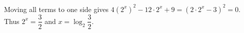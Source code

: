 Moving all terms to one side gives $4(2^x)^2-12\cdot2^x+9=(2\cdot2^x-3)^2=0$. Thus $2^x=\dfrac{3}{2}$ and $\boxed{x=\log_2\dfrac{3}{2}}$.
